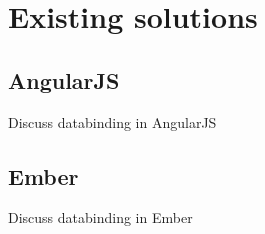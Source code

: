 \chapter{Existing solutions}\label{chap:existingsolutions}

\section{AngularJS}\label{sec:angularjs}

Discuss databinding in AngularJS

\section{Ember}\label{sec:ember}

Discuss databinding in Ember


